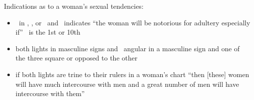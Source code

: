 Indications as to a woman's sexual tendencies:
\begin{itemize}[topsep=0em,itemsep=0em]
\item \Moon\, in \Taurus, \Aquarius, or \Pisces\, and \Mars\Conjunction\Mercury\, indicates ``the woman will be notorious for adultery especially if'' \Venus\, is the 1st or 10th

\item both lights in masculine signs and \Venus\, angular in a masculine sign and one of the three square or opposed to the other

\item if both lights are trine to their rulers in a woman's chart ``then [these] women will have much intercourse with men and a great number of men will have intercourse with them''
\end{itemize}
